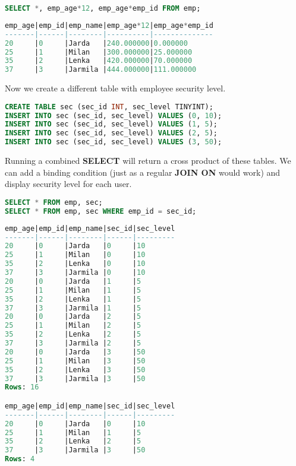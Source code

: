 \documentclass[a4paper]{article}
\begin{document}
\vspace{0.5cm}
\begin{lstlisting}[language=SQL, backgroundcolor=\color{lbcolor}]
SELECT *, emp_age*12, emp_age*emp_id FROM emp;
\end{lstlisting}
\begin{lstlisting}[language=SQL, backgroundcolor=\color{gbcolor}]
emp_age|emp_id|emp_name|emp_age*12|emp_age*emp_id
-------|------|--------|----------|--------------
20     |0     |Jarda   |240.000000|0.000000      
25     |1     |Milan   |300.000000|25.000000     
35     |2     |Lenka   |420.000000|70.000000     
37     |3     |Jarmila |444.000000|111.000000    
\end{lstlisting}
\vspace{0.5cm}

Now we create a different table with employee security level.

\vspace{0.5cm}
\begin{lstlisting}[language=SQL, backgroundcolor=\color{lbcolor}]
CREATE TABLE sec (sec_id INT, sec_level TINYINT);
INSERT INTO sec (sec_id, sec_level) VALUES (0, 10);
INSERT INTO sec (sec_id, sec_level) VALUES (1, 5);
INSERT INTO sec (sec_id, sec_level) VALUES (2, 5);
INSERT INTO sec (sec_id, sec_level) VALUES (3, 50);
\end{lstlisting}
\vspace{0.5cm}

Running a combined \textbf{SELECT} will return a cross product of these tables. We can add a binding condition (just as a regular \textbf{JOIN ON} would work) and display security level for each user. 

\vspace{0.5cm}
\begin{lstlisting}[language=SQL, backgroundcolor=\color{lbcolor}]
SELECT * FROM emp, sec;
SELECT * FROM emp, sec WHERE emp_id = sec_id;
\end{lstlisting}
\begin{lstlisting}[language=SQL, backgroundcolor=\color{gbcolor}]
emp_age|emp_id|emp_name|sec_id|sec_level
-------|------|--------|------|---------
20     |0     |Jarda   |0     |10       
25     |1     |Milan   |0     |10       
35     |2     |Lenka   |0     |10       
37     |3     |Jarmila |0     |10       
20     |0     |Jarda   |1     |5        
25     |1     |Milan   |1     |5        
35     |2     |Lenka   |1     |5        
37     |3     |Jarmila |1     |5        
20     |0     |Jarda   |2     |5        
25     |1     |Milan   |2     |5        
35     |2     |Lenka   |2     |5        
37     |3     |Jarmila |2     |5        
20     |0     |Jarda   |3     |50       
25     |1     |Milan   |3     |50       
35     |2     |Lenka   |3     |50       
37     |3     |Jarmila |3     |50       
Rows: 16

emp_age|emp_id|emp_name|sec_id|sec_level
-------|------|--------|------|---------
20     |0     |Jarda   |0     |10       
25     |1     |Milan   |1     |5        
35     |2     |Lenka   |2     |5        
37     |3     |Jarmila |3     |50       
Rows: 4
\end{lstlisting}
\vspace{0.5cm}
\end{document}
